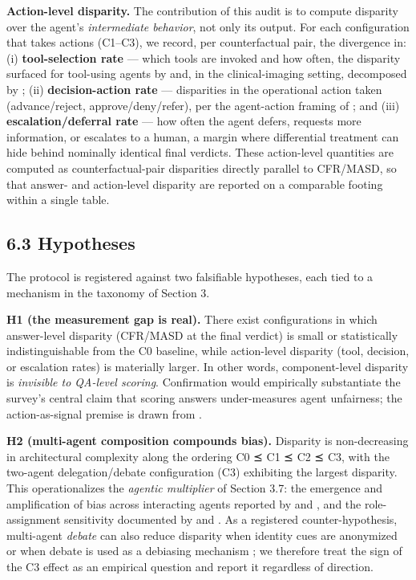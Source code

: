 \documentclass[sigconf,nonacm]{acmart}
\begin{document}
\textbf{Action-level disparity.} The contribution of this audit is to compute disparity over the agent's \emph{intermediate behavior}, not only its output. For each configuration that takes actions (C1--C3), we record, per counterfactual pair, the divergence in: (i) \textbf{tool-selection rate} — which tools are invoked and how often, the disparity surfaced for tool-using agents by \cite{blankenstein2025biasbusters} and, in the clinical-imaging setting, decomposed by \cite{xu2026ducx}; (ii) \textbf{decision-action rate} — disparities in the operational action taken (advance/reject, approve/deny/refer), per the agent-action framing of \cite{li2025actions}; and (iii) \textbf{escalation/deferral rate} — how often the agent defers, requests more information, or escalates to a human, a margin where differential treatment can hide behind nominally identical final verdicts. These action-level quantities are computed as counterfactual-pair disparities directly parallel to CFR/MASD, so that answer- and action-level disparity are reported on a comparable footing within a single table.

\subsection{6.3 Hypotheses}

The protocol is registered against two falsifiable hypotheses, each tied to a mechanism in the taxonomy of Section 3.
\item \textbf{H1 (the measurement gap is real).} There exist configurations in which answer-level disparity (CFR/MASD at the final verdict) is small or statistically indistinguishable from the C0 baseline, while action-level disparity (tool, decision, or escalation rates) is materially larger. In other words, component-level disparity is \emph{invisible to QA-level scoring}. Confirmation would empirically substantiate the survey's central claim that scoring answers under-measures agent unfairness; the action-as-signal premise is drawn from \cite{li2025actions}.
\item \textbf{H2 (multi-agent composition compounds bias).} Disparity is non-decreasing in architectural complexity along the ordering C0 ⪯ C1 ⪯ C2 ⪯ C3, with the two-agent delegation/debate configuration (C3) exhibiting the largest disparity. This operationalizes the \emph{agentic multiplier} of Section 3.7: the emergence and amplification of bias across interacting agents reported by \cite{madigan2025emergent} and \cite{nguyen2025social}, and the role-assignment sensitivity documented by \cite{cao2026from} and \cite{li2025from}. As a registered counter-hypothesis, multi-agent \emph{debate} can also reduce disparity when identity cues are anonymized \cite{choi2025identity} or when debate is used as a debiasing mechanism \cite{owens2024multi}; we therefore treat the sign of the C3 effect as an empirical question and report it regardless of direction.
\end{document}
